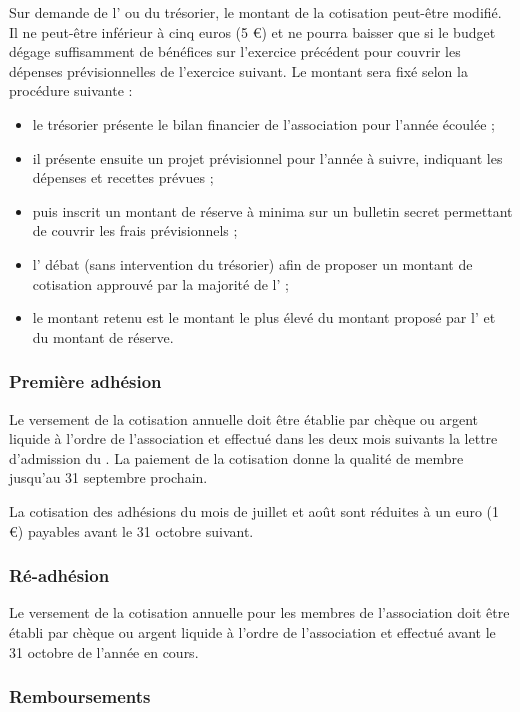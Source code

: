 \documentclass[a4paper,french,10pt]{article}
\begin{document}
Sur demande de l'\AG{} ou du trésorier, le montant de la cotisation peut-être modifié. Il ne peut-être inférieur à cinq euros (5 \euro{}) et ne pourra baisser que si le budget dégage suffisamment de bénéfices sur l'exercice précédent pour couvrir les dépenses prévisionnelles de l'exercice suivant. Le montant sera fixé selon la procédure suivante :
\begin{itemize}
\item le trésorier présente le bilan financier de l'association pour l'année écoulée ;
\item il présente ensuite un projet prévisionnel pour l'année à suivre, indiquant les dépenses et recettes prévues ;
\item puis inscrit un montant de réserve à minima sur un bulletin secret permettant de couvrir les frais prévisionnels ;
\item l'\AG{} débat (sans intervention du trésorier) afin de proposer un montant de cotisation approuvé par la majorité de l'\AG{} ;
\item le montant retenu est le montant le plus élevé du montant proposé par l'\AG{} et du montant de réserve.
\end{itemize}

\subsubsection*{Première adhésion}

Le versement de la cotisation annuelle doit être établie par chèque ou argent liquide à l'ordre de l'association et effectué dans les deux mois suivants la lettre d'admission du \bureau{}. La paiement de la cotisation donne la qualité de membre jusqu'au 31 septembre prochain.

La cotisation des adhésions du mois de juillet et août sont réduites à un euro (1  \euro{}) payables avant le 31 octobre suivant.

\subsubsection*{Ré-adhésion}

Le versement de la cotisation annuelle pour les membres de l'association doit être établi par chèque ou argent liquide à l'ordre de l'association et effectué avant le 31 octobre de l'année en cours.

\subsubsection*{Remboursements}
\end{document}
